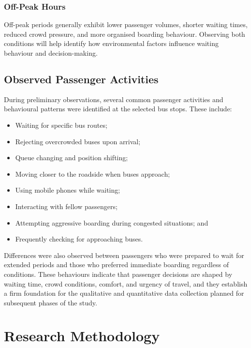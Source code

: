 \documentclass[12pt, a4paper]{report}
\begin{document}
\subsection{Off-Peak Hours}

Off-peak periods generally exhibit lower passenger volumes, shorter waiting times, reduced
crowd pressure, and more organised boarding behaviour. Observing both conditions will help
identify how environmental factors influence waiting behaviour and decision-making.

\section{Observed Passenger Activities}

During preliminary observations, several common passenger activities and behavioural
patterns were identified at the selected bus stops. These include:

\begin{itemize}[noitemsep]
    \item Waiting for specific bus routes;
    \item Rejecting overcrowded buses upon arrival;
    \item Queue changing and position shifting;
    \item Moving closer to the roadside when buses approach;
    \item Using mobile phones while waiting;
    \item Interacting with fellow passengers;
    \item Attempting aggressive boarding during congested situations; and
    \item Frequently checking for approaching buses.
\end{itemize}

Differences were also observed between passengers who were prepared to wait for extended
periods and those who preferred immediate boarding regardless of conditions. These
behaviours indicate that passenger decisions are shaped by waiting time, crowd conditions,
comfort, and urgency of travel, and they establish a firm foundation for the qualitative and
quantitative data collection planned for subsequent phases of the study.

\chapter{Research Methodology}
\end{document}
